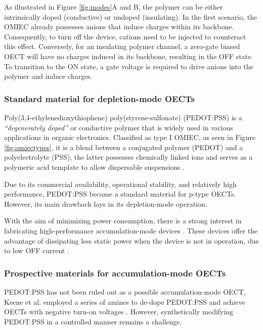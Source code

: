 As illustrated in Figure \ref{fig:modes}A and B, the polymer can be either intrinsically doped (conductive) or undoped (insulating). In the first scenario, the OMIEC already possesses anions that induce charges within its backbone. Consequently, to turn off the device, cations need to be injected to counteract this effect. Conversely, for an insulating polymer channel, a zero-gate biased OECT will have no charges induced in its backbone, resulting in the OFF state. To transition to the ON state, a gate voltage is required to drive anions into the polymer and induce charges.

\subsubsection{Standard material for depletion-mode OECTs}

Poly(3,4-ethylenedioxythiophene) poly(styrene-sulfonate) (PEDOT:PSS) is a \textit{``degenerately doped''} \cite{bernardsSteadyStateTransientBehavior2007} or conductive polymer that is widely used in various applications in organic electronics. Classified as type I OMIEC, as seen in Figure \ref{fig:omiectypes}, it is a blend between a conjugated polymer (PEDOT) and a polyelectrolyte (PSS), the latter possesses chemically linked ions and serves as a polymeric acid template to allow dispersable suspensions \cite{paulsenOrganicMixedIonic2020}.

Due to its commercial availability, operational stability, and relatively high performance, PEDOT:PSS became a standard material for p-type OECTs. However, its main drawback lays in its depletion-mode operation.

With the aim of minimizing power consumption, there is a strong interest in fabricating high-performance accumulation-mode devices \cite{nielsenMolecularDesignSemiconducting2016}\cite{tanOrganicMixedIonic2022}\cite{inalBenchmarkingOrganicMixed2017}\cite{keeneEnhancementModePEDOTPSS2020}. These devices offer the advantage of dissipating less static power when the device is not in operation, due to low OFF current %
\cite{giovannittiEnergeticControlRedoxActive2020}.

\subsubsection{Prospective materials for accumulation-mode OECTs}
PEDOT:PSS has not been ruled out as a possible accumulation-mode OECT, Keene et al. employed a series of amines to de-dope PEDOT:PSS and achieve OECTs with negative turn-on voltages \cite{keeneEnhancementModePEDOTPSS2020}. However, synthetically modifying PEDOT:PSS in a controlled manner remains a challenge. 


